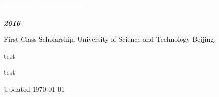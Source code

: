 \documentclass[12pt,a4paper,utf8]{report}
\begin{document}
\begin{minipage}[t]{16cm}
    \begin{snugshade}{\textcolor{white}{\textsf{\quad 
        AWARDS AND HONORS
    \qquad}}}\end{snugshade}
\end{minipage}\par
\vspace{0.2cm}\hspace{0.5cm}
\begin{minipage}[t]{15cm}
    {\textbf{\em{2016}}}\par
    \quad First-Class Scholarship, University of Science and Technology Beijing.\par
    \vspace{0.2cm}
\end{minipage}\par
\vspace{0.4cm}

\newpage

test

\newpage

test

\begin{center}\vspace{1.0cm}
    Updated \monthyeardate\today
\end{center}
\end{document}
